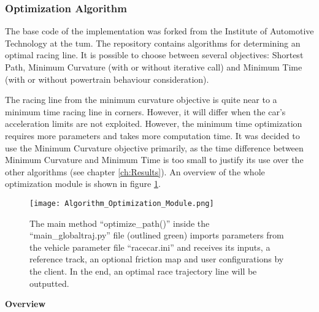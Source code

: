 \subsubsection{Optimization Algorithm} \label{sec:Optimization Algorithm}
The base code of the implementation was forked from the Institute of Automotive Technology at the \acrlong{tum}.
The repository contains algorithms for determining an optimal racing line. It is possible to choose between several objectives: Shortest Path, Minimum Curvature (with or without iterative call) and Minimum Time (with or without powertrain behaviour consideration). \cite{tumftm_optimization_algoritm}

The racing line from the minimum curvature objective is quite near to a minimum time racing line in corners. However, it will differ when the car's acceleration limits are not exploited. However, the minimum time optimization requires more parameters and takes more computation time. It was decided to use the Minimum Curvature objective primarily, as the time difference between Minimum Curvature and Minimum Time is too small to justify its use over the other algorithms (see chapter \ref{ch:Results}). An overview of the whole optimization module is shown in figure \ref{fig:Optimization Algorithm Module Overview}.
\begin{figure}[H]
    \centering
    \texttt{[image: Algorithm\_Optimization\_Module.png]}
    \caption{The main method ``optimize\_path()'' inside the ``main\_globaltraj.py'' file (outlined green) imports parameters from the vehicle parameter file ``racecar.ini'' and receives its inputs, a reference track, an optional friction map and user configurations by the client. In the end, an optimal race trajectory line will be outputted.}
    \label{fig:Optimization Algorithm Module Overview}
\end{figure}

\textbf{Overview}

